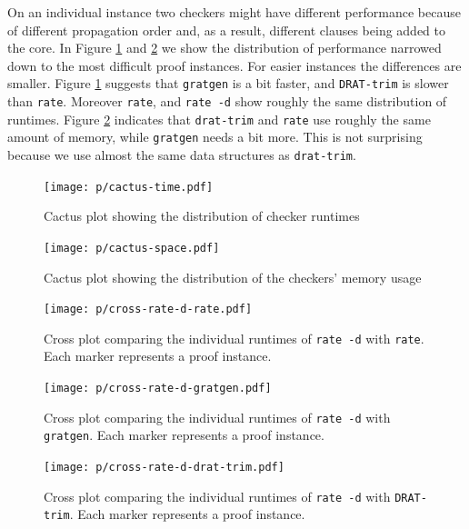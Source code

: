 \documentclass[
]{report}
\begin{document}
On an individual instance two checkers might have different performance
because of different propagation order and, as a result, different
clauses being added to the core. In Figure \ref{fig:cactus-time} and
\ref{fig:cactus-space} we show the distribution of performance narrowed
down to the most difficult proof instances. For easier instances the
differences are smaller. Figure \ref{fig:cactus-time} suggests that
\texttt{gratgen} is a bit faster, and \texttt{DRAT-trim} is slower than
\texttt{rate}. Moreover \texttt{rate}, and \texttt{rate\ -d} show
roughly the same distribution of runtimes. Figure \ref{fig:cactus-space}
indicates that \texttt{drat-trim} and \texttt{rate} use roughly the same
amount of memory, while \texttt{gratgen} needs a bit more. This is not
surprising because we use almost the same data structures as
\texttt{drat-trim}.

\begin{figure}
\centering
\texttt{[image: p/cactus-time.pdf]}
\caption{Cactus plot showing the distribution of checker
runtimes\label{fig:cactus-time}}
\end{figure}

\begin{figure}
\centering
\texttt{[image: p/cactus-space.pdf]}
\caption{Cactus plot showing the distribution of the checkers' memory
usage\label{fig:cactus-space}}
\end{figure}

\begin{figure}
\centering
\texttt{[image: p/cross-rate-d-rate.pdf]}
\caption{Cross plot comparing the individual runtimes of
\texttt{rate\ -d} with \texttt{rate}. Each marker represents a proof
instance.\label{fig:cross-rate-d-rate}}
\end{figure}

\begin{figure}
\centering
\texttt{[image: p/cross-rate-d-gratgen.pdf]}
\caption{Cross plot comparing the individual runtimes of
\texttt{rate\ -d} with \texttt{gratgen}. Each marker represents a proof
instance.\label{fig:cross-rate-d-gratgen}}
\end{figure}

\begin{figure}
\centering
\texttt{[image: p/cross-rate-d-drat-trim.pdf]}
\caption{Cross plot comparing the individual runtimes of
\texttt{rate\ -d} with \texttt{DRAT-trim}. Each marker represents a
proof instance.\label{fig:cross-rate-d-drat-trim}}
\end{figure}
\end{document}
